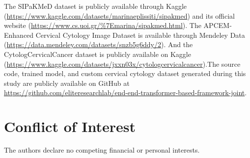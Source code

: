 \documentclass[pdflatex,sn-nature]{sn-jnl}%
\theoremstyle{thmstyleone}%
\theoremstyle{thmstyletwo}%
\theoremstyle{thmstylethree}%
\begin{document}
The SIPaKMeD dataset is publicly available through Kaggle (\url{https://www.kaggle.com/datasets/marinaeplissiti/sipakmed}) and its official website (\url{https://www.cs.uoi.gr/\%7Emarina/sipakmed.html}). The APCEM-Enhanced Cervical Cytology Image Dataset is available through Mendeley Data (\url{https://data.mendeley.com/datasets/snzb5g6ddy/2}). And the CytologCervicalCancer dataset is publicly available on Kaggle (\url{https://www.kaggle.com/datasets/jxxn03x/cytologcervicalcancer}).The source code, trained model, and custom cervical cytology dataset generated during this study are publicly available on GitHub at \url{https://github.com/eliteresearchlab/end-end-transformer-based-framework-joint}.

\section*{Conflict of Interest}
The authors declare no competing financial or personal interests.












\end{document}
